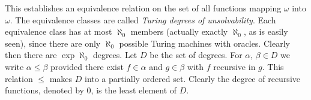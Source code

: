 This establishes an equivalence relation on the set of all functions mapping $\omega$ into $\omega$. The equivalence classes are called \emph{Turing degrees of unsolvability}. Each equivalence class has at most $\aleph_0$ members (actually exactly $\aleph_0$, as is easily seen), since there are only $\aleph_0$ possible Turing machines with oracles. Clearly then there are $\exp \aleph_0$ degrees. Let $D$ be the set of degrees. For $\alpha$, $\beta \in D$ we write $\alpha \leq \beta$ provided there exist $f \in \alpha$ and $g \in \beta$ with $f$ recursive in $g$. This relation $\leq$ makes $D$ into a partially ordered set. Clearly the degree of recursive functions, denoted by $0$, is the least element of $D$.

